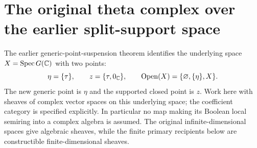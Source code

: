\documentclass[11pt]{article}
\begin{document}
\section{The original theta complex over the earlier split-support space}
The earlier generic-point-suspension theorem identifies the underlying
space $X=\operatorname{Spec}G(\mathbb C)$ with two points:
\[
 \eta=\{\tau\},\qquad z=\{\tau,0_\mathbb C\},\qquad
 \operatorname{Open}(X)=\{\varnothing,\{\eta\},X\}.
\]
The new generic point is $\eta$ and the supported closed point is $z$.
Work here with sheaves of complex vector spaces on this underlying
space; the coefficient category is specified explicitly. In particular
no map making its Boolean local semiring into a complex algebra is
assumed. The original infinite-dimensional spaces give algebraic
sheaves, while the finite primary recipients below are constructible
finite-dimensional sheaves.
\end{document}

